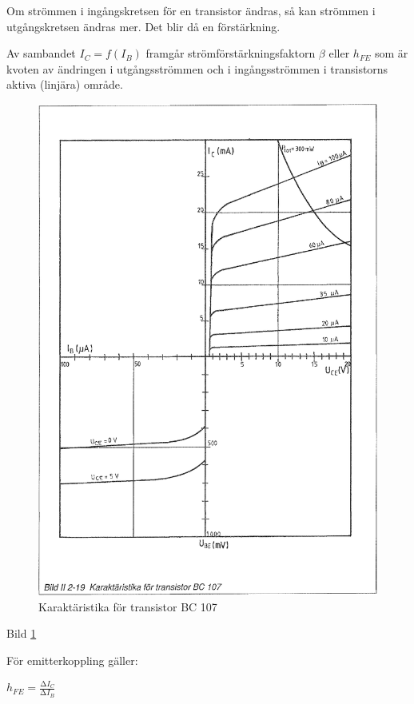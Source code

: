 Om strömmen i ingångskretsen för en transistor ändras, så kan strömmen i
utgångskretsen ändras mer. Det blir då en förstärkning.

Av sambandet \(I_C = f(I_B)\) framgår strömförstärkningsfaktorn \(\beta\) eller
\(h_{FE}\) som är kvoten av ändringen i utgångsströmmen och i ingångsströmmen i
transistorns aktiva (linjära) område.

\begin{figure}
\includegraphics[width=\textwidth]{images/bild_2_2-19}
\caption{Karaktäristika för transistor BC 107}
\label{fig:BildII2-19}
\end{figure}

Bild \ref{fig:BildII2-19}

För emitterkoppling gäller:

\(h_{FE} = \frac{∆I_C}{∆I_B}\)

